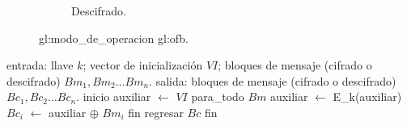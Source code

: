 \begin{figure}
\begin{subfigure}{0.45\textwidth}
\begin{center}
      \caption{Descifrado.}
    \end{center}
  \end{subfigure}
  \caption{\Gls{gl:modo_de_operacion} \gls{gl:ofb}.}
\end{figure}

\begin{pseudocodigo}[%
    caption={\Gls{gl:modo_de_operacion} \gls{gl:ofb}%
      (cifrado y descifrado).}%
    ]
    entrada: llave $ k $; vector de inicialización $ VI $;
             bloques de mensaje (cifrado o descifrado) $ Bm_1, Bm_2 \dots Bm_n $.
    salida:  bloques de mensaje (cifrado o descifrado) $ Bc_1, Bc_2 \dots Bc_n $.
    inicio
      auxiliar $\gets$ $ VI $
      para_todo $Bm$
        auxiliar $\gets$ E_k(auxiliar)
        $Bc_i$ $\gets$  auxiliar $\oplus$ $Bm_i$
      fin
      regresar $Bc$
    fin
\end{pseudocodigo}
